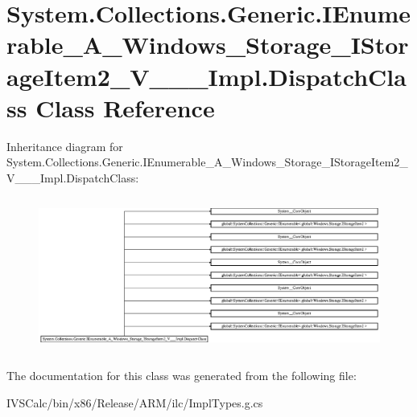\hypertarget{class_system_1_1_collections_1_1_generic_1_1_i_enumerable___a___windows___storage___i_storage_itecea00bfbd7f803d947d0784a0179708}{}\section{System.\+Collections.\+Generic.\+I\+Enumerable\+\_\+\+A\+\_\+\+Windows\+\_\+\+Storage\+\_\+\+I\+Storage\+Item2\+\_\+\+V\+\_\+\+\_\+\+\_\+\+Impl.\+Dispatch\+Class Class Reference}
\label{class_system_1_1_collections_1_1_generic_1_1_i_enumerable___a___windows___storage___i_storage_itecea00bfbd7f803d947d0784a0179708}
Inheritance diagram for System.\+Collections.\+Generic.\+I\+Enumerable\+\_\+\+A\+\_\+\+Windows\+\_\+\+Storage\+\_\+\+I\+Storage\+Item2\+\_\+\+V\+\_\+\+\_\+\+\_\+\+Impl.\+Dispatch\+Class\+:\begin{figure}[H]
\begin{center}
\leavevmode
\includegraphics[height=5.141903cm]{class_system_1_1_collections_1_1_generic_1_1_i_enumerable___a___windows___storage___i_storage_itecea00bfbd7f803d947d0784a0179708}
\end{center}
\end{figure}


The documentation for this class was generated from the following file\+:\begin{DoxyCompactItemize}
\item 
I\+V\+S\+Calc/bin/x86/\+Release/\+A\+R\+M/ilc/Impl\+Types.\+g.\+cs\end{DoxyCompactItemize}
